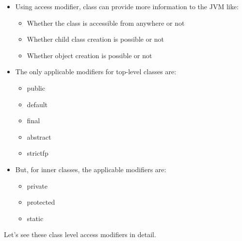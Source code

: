 \setlength{\columnsep}{3pt}
\begin{flushleft}
	
	\begin{itemize}
		\item Using access modifier, class can provide more information to the JVM like:
		\begin{itemize}
			\item Whether the class is accessible from anywhere or not
			\item Whether child class creation is possible or not
			\item Whether object creation is possible or not
		\end{itemize}
		\item The only applicable modifiers for top-level classes are:
		\begin{itemize}
			\item public
			\item default
			\item final
			\item abstract
			\item strictfp
		\end{itemize}
		\item But, for inner classes, the applicable modifiers are:
		\begin{itemize}
			\item private
			\item protected 
			\item static
		\end{itemize}
	
	\end{itemize}

	
	
	Let's see these class level access modifiers in detail.
	
	\newpage
	

\end{flushleft}
